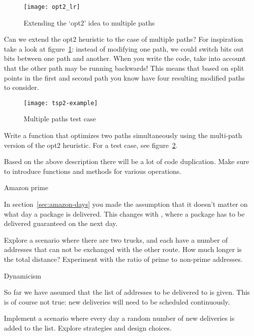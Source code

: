 \begin{figure}[ht]
  \texttt{[image: opt2\_lr]}
  \caption{Extending the `opt2' idea to multiple paths}
  \label{fig:opt2_lr}
\end{figure}

Can we extend the opt2 heuristic to the case of multiple paths?
For inspiration take a look at figure~\ref{fig:opt2_lr}: instead of
modifying one path, we could switch bits out bits between one path and another.
When you write the code, take into account that the other path may be
running backwards! This means that based on split points in the first
and second path you know have four resulting modified paths to
consider.

\begin{figure}[ht]
  \texttt{[image: tsp2-example]}
  \caption{Multiple paths test case}
  \label{fig:tsp2-example}
\end{figure}

\begin{exercise}
  Write a function that optimizes two paths simultaneously using the
  multi-path version of the opt2 heuristic. For a test case, see
  figure~\ref{fig:tsp2-example}.
\end{exercise}

Based on the above description there will be a lot of code
duplication. Make sure to introduce functions and methods for various
operations.

 {Amazon prime}

In section~\ref{sec:amazon-days} you made the assumption that it
doesn't matter on what day a package is delivered. This changes with
, where a package has to be delivered
guaranteed on the next day.

\begin{exercise}
  Explore a scenario where there are two trucks, and each have a number
  of addresses that can not be exchanged with the other route.
  How much longer is the total distance? Experiment with
  the ratio of prime to non-prime addresses.
\end{exercise}

 {Dynamicism}

So far we have assumed that the list of addresses to be delivered to
is given. This is of course not true: new deliveries will need to be
scheduled continuously.

\begin{exercise}
  Implement a scenario where every day a random number of new
  deliveries is added to the list. Explore strategies and design choices.
\end{exercise}
